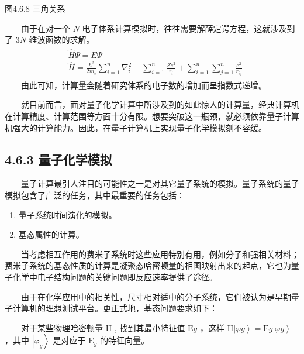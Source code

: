 \documentclass[a4paper,11pt,english]{sphinxmanual}
\begin{document}
\begin{center}图4.6.8 三角关系
\end{center}
\sphinxAtStartPar
  由于在对一个 \(N\) 电子体系计算模拟时，往往需要解薛定谔方程，这就涉及到了 \(3N\) 维波函数的求解。
\begin{equation*}
\begin{split}\begin{aligned} &\hat{H} \Psi=E \Psi \\ &\hat{H}=\frac{h^{2}}{2 m_{e}} \sum_{i=1}^{n} \nabla_{i}^{2}-\sum_{i=1}^{n} \frac{Z e^{2}}{r_{i}}+\sum_{i=1}^{n} \sum_{j=1}^{n} \frac{e^{2}}{r_{i j}} \end{aligned}\end{split}
\end{equation*}
\sphinxAtStartPar
  由此可知，计算量会随着研究体系的电子数的增加而呈指数式递增。

\sphinxAtStartPar
  就目前而言，面对量子化学计算中所涉及到的如此惊人的计算量，经典计算机在计算精度、计算范围等方面十分有限。想要突破这一瓶颈，就必须依靠量子计算机强大的计算能力。因此，在量子计算机上实现量子化学模拟刻不容缓。


\subsection{4.6.3 量子化学模拟}
\label{\detokenize{rst/4.6VQE_u7b97_u6cd5:id3}}
\sphinxAtStartPar
  量子计算最引人注目的可能性之一是对其它量子系统的模拟。量子系统的量子模拟包含了广泛的任务，其中最重要的任务包括：
\begin{enumerate}
%
\item {} 
\sphinxAtStartPar
量子系统时间演化的模拟。

\item {} 
\sphinxAtStartPar
基态属性的计算。

\end{enumerate}

\sphinxAtStartPar
  当考虑相互作用的费米子系统时这些应用特别有用，例如分子和强相关材料；费米子系统的基态性质的计算是凝聚态哈密顿量的相图映射出来的起点，它也为量子化学中电子结构问题的关键问题即反应速率提供了途径。

\sphinxAtStartPar
  由于在化学应用中的相关性，尺寸相对适中的分子系统，它们被认为是早期量子计算机的理想测试平台。更正式地，基态问题要求如下：

\sphinxAtStartPar
  对于某些物理哈密顿量 \(\mathrm{H}\) , 找到其最小特征值  \(\mathrm{E}{g}\) ，这样  \(\mathrm{H}\left|\varphi{g}\right\rangle=\mathrm{E}{g}\left|\varphi{g}\right\rangle\) ，其中 \(\left|\varphi_{g}\right\rangle\) 是对应于  \(\mathrm{E}_{g}\) 的特征向量。
\end{document}
